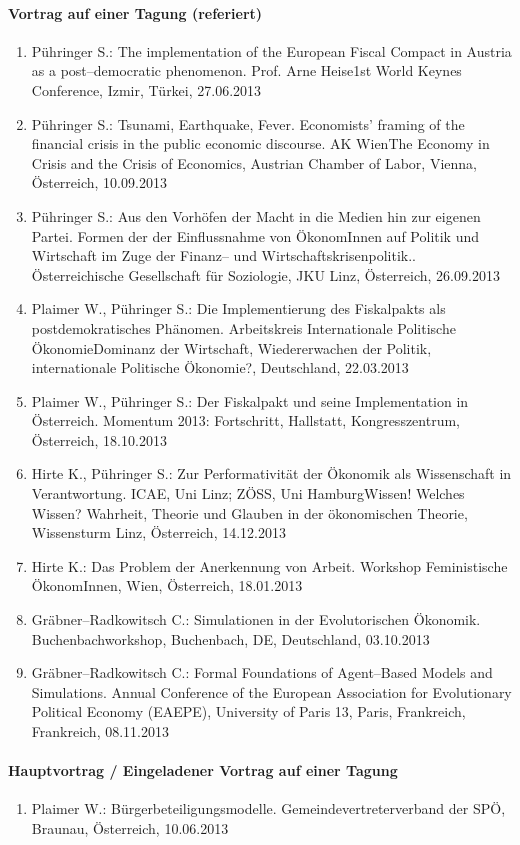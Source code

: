 \paragraph{Vortrag auf einer Tagung (referiert)}
\begin{enumerate}
	\item Pühringer S.: The implementation of the European Fiscal Compact in Austria as a post--democratic phenomenon. Prof. Arne Heise1st World Keynes Conference, Izmir, Türkei, 27.06.2013
	\item Pühringer S.: Tsunami, Earthquake, Fever. Economists’ framing of the financial crisis in the public economic discourse. AK WienThe Economy in Crisis and the Crisis of Economics, Austrian Chamber of Labor, Vienna, Österreich, 10.09.2013
	\item Pühringer S.: Aus den Vorhöfen der Macht in die Medien hin zur eigenen Partei. Formen der der Einflussnahme von ÖkonomInnen auf Politik und Wirtschaft im Zuge der Finanz-- und Wirtschaftskrisenpolitik.. Österreichische Gesellschaft für Soziologie, JKU Linz, Österreich, 26.09.2013
	\item Plaimer W., Pühringer S.: Die Implementierung des Fiskalpakts als postdemokratisches Phänomen. Arbeitskreis Internationale Politische ÖkonomieDominanz der Wirtschaft, Wiedererwachen der Politik, internationale Politische Ökonomie?, Deutschland, 22.03.2013
	\item Plaimer W., Pühringer S.: Der Fiskalpakt und seine Implementation in Österreich. Momentum 2013: Fortschritt, Hallstatt, Kongresszentrum, Österreich, 18.10.2013
	\item Hirte K., Pühringer S.: Zur Performativität der Ökonomik als Wissenschaft in Verantwortung. ICAE, Uni Linz; ZÖSS, Uni HamburgWissen! Welches Wissen? Wahrheit, Theorie und Glauben in der ökonomischen Theorie, Wissensturm Linz, Österreich, 14.12.2013
	\item Hirte K.: Das Problem der Anerkennung von Arbeit. Workshop Feministische ÖkonomInnen, Wien, Österreich, 18.01.2013
	\item Gräbner--Radkowitsch C.: Simulationen in der Evolutorischen Ökonomik. Buchenbachworkshop, Buchenbach, DE, Deutschland, 03.10.2013
	\item Gräbner--Radkowitsch C.: Formal Foundations of Agent--Based Models and Simulations. Annual Conference of the European Association for Evolutionary Political Economy (EAEPE), University of Paris 13, Paris, Frankreich, Frankreich, 08.11.2013
\end{enumerate}
\paragraph{Hauptvortrag / Eingeladener Vortrag auf einer Tagung}
\begin{enumerate}
	\item Plaimer W.: Bürgerbeteiligungsmodelle. Gemeindevertreterverband der SPÖ, Braunau, Österreich, 10.06.2013
\end{enumerate}
